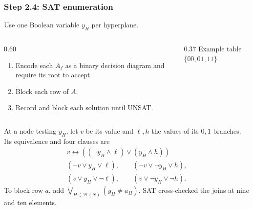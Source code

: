 \documentclass{beamer}
\newcommand{\HH}{\mathcal H}
\begin{document}
\begin{frame}
  \frametitle{Step 2.4: SAT enumeration}
  Use one Boolean variable $y_H$ per hyperplane.
  \begin{columns}[T,onlytextwidth]
    \begin{column}{0.60\textwidth}
      \begin{enumerate}
        \item Encode each $A_f$ as a binary decision diagram and
          require its root to accept.
        \item Block each row of $A$.
        \item Record and block each solution until UNSAT.
      \end{enumerate}
    \end{column}
    \begin{column}{0.37\textwidth}
      \centering
      \small Example table $\{00,01,11\}$

    \end{column}
  \end{columns}

  \medskip
  At a node testing $y_H$, let $v$ be its value and $\ell,h$ the
  values of its $0,1$ branches. Its equivalence and four clauses are
  \[
    \begin{gathered}
      v\leftrightarrow((\neg y_H\land\ell)\lor(y_H\land h))\\[3pt]
      (\neg v\lor y_H\lor\ell),\qquad(\neg v\lor\neg y_H\lor h),\\
      (v\lor y_H\lor\neg\ell),\qquad(v\lor\neg y_H\lor\neg h).
    \end{gathered}
  \]
  To block row $a$, add $\bigvee_{H\in\HH(N)}(y_H\ne a_H)$.
  SAT cross-checked the joins at nine and ten elements.
\end{frame}
\end{document}
